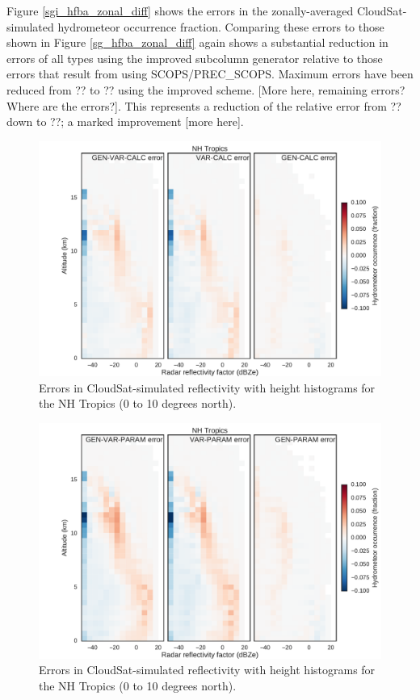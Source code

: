 Figure \ref{sgi_hfba_zonal_diff} shows the errors in the zonally-averaged CloudSat-simulated hydrometeor occurrence fraction. Comparing these errors to those shown in Figure \ref{sg_hfba_zonal_diff} again shows a substantial reduction in errors of all types using the improved subcolumn generator relative to those errors that result from using SCOPS/PREC\_SCOPS. Maximum errors have been reduced from ?? to ?? using the improved scheme. [More here, remaining errors? Where are the errors?]. This represents a reduction of the relative error from ?? down to ??; a marked improvement [more here].

\begin{figure}
\centering
\includegraphics[width=\columnwidth]{graphics/subgrid2_cfadDbze94_NHTropics_gen-var-calc_diff.pdf}
\caption{Errors in CloudSat-simulated reflectivity with height histograms for the NH Tropics (0 to 10 degrees north).}
\label{sgi_cfadDbze94_nhtropics_diff}
\end{figure}

\begin{figure}
\centering
\includegraphics[width=\columnwidth]{graphics/subgrid2_cfadDbze94_NHTropics_gen-var-param_diff.pdf}
\caption{Errors in CloudSat-simulated reflectivity with height histograms for the NH Tropics (0 to 10 degrees north).}
\label{sgi_cfadDbze94_nhtropics_gen-var-param_diff}
\end{figure}

